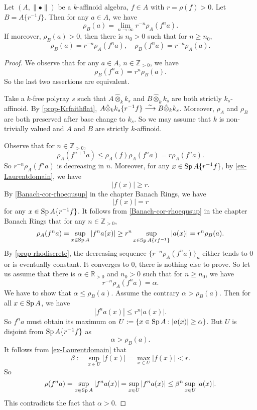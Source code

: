 \begin{lemma}\label{lma-rhoBandrhoA}
    Let $(A,\|\bullet\|)$ be a $k$-affinoid algebra, $f\in A$ with $r=\rho(f)>0$. Let $B=A\{r^{-1}f\}$. Then for any $a\in A$, we have
    \[
        \rho_B(a)=\lim_{n\to\infty}r^{-n}\rho_A(f^na).
    \]  
    If moreover, $\rho_B(a)>0$, then there is $n_0>0$ such that for $n\geq n_0$,
    \[
        \rho_B(a)=r^{-n}\rho_A(f^na),\quad   \rho_B(f^na)=r^{-n}\rho_A(a).
    \]
\end{lemma}
\begin{proof}
    We observe that for any $a\in A$, $n\in \mathbb{Z}_{>0}$, we have
    \[
        \rho_B(f^na)=r^n\rho_B(a).
    \]
    So the last two assertions are equivalent.

    Take a $k$-free polyray $s$ such that $A\hat{\otimes}_k k_s$ and $B\hat{\otimes}_k k_s$ are both strictly $k_s$-affinoid. By \cref{prop-Krfaithflat}, $A\hat{\otimes}_k k_s\{r^{-1}f\}\stackrel{\sim}{\longrightarrow} B\hat{\otimes}_k k_s$. Moreover, $\rho_A$ and $\rho_B$ are both preserved after base change to $k_s$. So we may assume that $k$ is non-trivially valued and $A$ and $B$ are strictly $k$-affinoid.

    Observe that  for $n\in \mathbb{Z}_{>0}$, 
    \[
        \rho_A(f^{n+1}a)\leq \rho_A(f)\rho_A(f^na)=r   \rho_A(f^na). 
    \]
    So $r^{-n}\rho_A(f^{n}a)$ is decreasing in $n$. Moreover, for any $x\in \operatorname{Sp} A\{r^{-1}f\}$, by \cref{ex-Laurentdomain}, we have
    \[
        |f(x)|\geq r. 
    \]
    By \cref{Banach-cor-rhoequsup} in the chapter Banach Rings, we have
    \[
        |f(x)|=r  
    \]
    for any $x\in \operatorname{Sp} A\{r^{-1}f\}$. It follows from \cref{Banach-cor-rhoequsup} in the chapter Banach Rings that for any $n\in \mathbb{Z}_{>0}$,
    \[
        \rho_A(f^na)=\sup_{x\in \operatorname{Sp} A}|f^na(x)|\geq  r^n\sup_{x\in \operatorname{Sp} A\{rf^{-1}\}}|a(x)|=r^n\rho_B(a). 
    \]
    By \cref{prop-rhodiscrete}, the decreasing sequence $\{r^{-n}\rho_A(f^na)\}_n$ either tends to $0$ or is eventually constant. It converges to $0$, there is nothing else to prove. So let us assume that there is $\alpha\in \mathbb{R}_{>0}$ and $n_0>0$ such that for $n\geq n_0$, we have
    \[
        r^{-n}\rho_A(f^na)=\alpha.  
    \]
    We have to show that $\alpha\leq \rho_B(a)$. Assume the contrary $\alpha>\rho_B(a)$. Then for all $x\in \operatorname{Sp} A$, we have
    \[
        |f^na(x)|\leq r^n|a(x)|.  
    \] 
    So $f^na$ must obtain its maximum on $U:=\{x\in \operatorname{Sp} A: |a(x)|\geq \alpha\}$. But $U$ is disjoint from $\operatorname{Sp} A\{r^{-1}f\}$ as
    \[
        \alpha>\rho_B(a).
    \]
    It follows from \cref{ex-Laurentdomain} that 
    \[
        \beta:=\sup_{x\in U}|f(x)|=\max_{x\in U}|f(x)|<r.  
    \]
    So
    \[
        \rho(f^na)=\sup_{x\in \operatorname{Sp} A}|f^na(x)|=\sup_{x\in U}|f^na(x)|\leq \beta^n \sup_{x\in U}|a(x)|.   
    \]
    This contradicts the fact that $\alpha>0$.
\end{proof}

